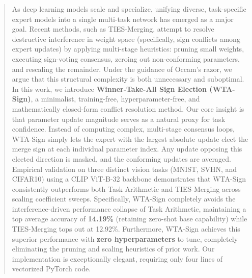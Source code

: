 \begin{abstract}
As deep learning models scale and specialize, unifying diverse, task-specific expert models into a single multi-task network has emerged as a major goal.
Recent methods, such as \mbox{TIES-Merging}, attempt to resolve destructive interference in weight space (specifically, sign conflicts among expert updates) by applying multi-stage heuristics: pruning small weights, executing sign-voting consensus, zeroing out non-conforming parameters, and rescaling the remainder.
Under the guidance of Occam's razor, we argue that this structural complexity is both unnecessary and suboptimal.
In this work, we introduce \textbf{\mbox{Winner-Take-All} Sign Election (WTA-Sign)}, a minimalist, training-free, hyperparameter-free, and mathematically closed-form conflict resolution method.
Our core insight is that parameter update magnitude serves as a natural proxy for task confidence.
Instead of computing complex, multi-stage consensus loops, WTA-Sign simply lets the expert with the largest absolute update elect the merge sign at each individual parameter index.
Any update opposing this elected direction is masked, and the conforming updates are averaged.
Empirical validation on three distinct vision tasks (\mbox{MNIST}, \mbox{SVHN}, and \mbox{CIFAR10}) using a CLIP \mbox{ViT-B-32} backbone demonstrates that WTA-Sign consistently outperforms both Task Arithmetic and \mbox{TIES-Merging} across scaling coefficient sweeps.
Specifically, WTA-Sign completely avoids the interference-driven performance collapse of Task Arithmetic, maintaining a top average accuracy of \textbf{14.19\%} (retaining zero-shot base capability) while TIES-Merging tops out at 12.92\%.
Furthermore, WTA-Sign achieves this superior performance with \textbf{zero hyperparameters} to tune, completely eliminating the pruning and scaling heuristics of prior work.
Our implementation is exceptionally elegant, requiring only four lines of vectorized PyTorch code.
\end{abstract}
